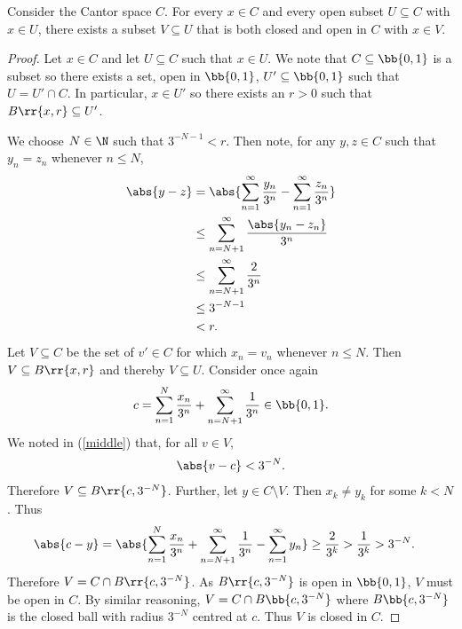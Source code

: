 \documentclass{article}
\begin{document}
\begin{claim*}[2d]
	Consider the Cantor space $C$. For every $x\in C$ and every open subset $U\subseteq C$
	with $x\in U$, there exists a subset $V\subseteq U$ that is both closed and open in $C$
	with $x\in V$.
	\begin{proof}
		Let $x\in C$ and let $U\subseteq C$ such that $x\in U$. We note that $C\subseteq\bb{0,1}$
		is a subset so there exists a set, open in $\bb{0,1}$, $U'\subseteq\bb{0,1}$ such that
		$U=U'\cap C$. In particular, $x\in U'$ so there exists an $r>0$ such that $B\rr{x,r}\subseteq U'$.

		We choose $N\in\N$ such that $3^{-N-1}<r$. Then note, for any $y,z\in C$ such that
		$y_n=z_n$ whenever $n\leq N$,
		\begin{align*}
			\abs{y-z} & = \abs{\sum_{n=1}^{\infty} \frac{y_n}{3^n} - \sum_{n=1}^{\infty} \frac{z_n}{3^n}} \\
			          & \leq \sum_{n=N+1}^{\infty} \frac{\abs{y_n-z_n}}{3^n}                              \\
			          & \leq \sum_{n=N+1}^{\infty} \frac{2}{3^n}                                          \\
			          & \leq 3^{-N-1}                                                                     \\
			          & <r.
		\end{align*}
		Let $V\subseteq C$ be the set of $v'\in C$ for which $x_n=v_n$ whenever $n\leq N$.
		Then $V\subseteq B\rr{x,r}$ and thereby $V\subseteq U$. Consider once again
		\begin{align*}
			c=\sum_{n=1}^{N} \frac{x_n}{3^n} + \sum_{n=N+1}^{\infty} \frac{1}{3^n} \in \bb{0,1}.
		\end{align*}
		We noted in (\ref{middle}) that, for all $v\in V$,
		\begin{align*}
			\abs{v-c}<3^{-N}.
		\end{align*}
		Therefore $V\subseteq B\rr{c,3^{-N}}$. Further, let $y\in C\setminus V$. Then
		$x_k\neq y_k$ for some $k<N$. Thus
		\begin{align*}
			\abs{c-y} & = \abs{\sum_{n=1}^{N} \frac{x_n}{3^n}+\sum_{n=N+1}^{\infty} \frac{1}{3^n} - \sum_{n=1}^{\infty} y_n}
			\geq \frac{2}{3^k} > \frac{1}{3^k} > 3^{-N}.
		\end{align*}
		Therefore $V=C\cap B\rr{c,3^{-N}}$. As $B\rr{c,3^{-N}}$ is open in $\bb{0,1}$, $V$ must be open in $C$.
		By similar reasoning, $V=C\cap B\bb{c,3^{-N}}$ where $B\bb{c,3^{-N}}$ is the closed ball with radius $3^{-N}$
		centred at $c$. Thus $V$ is closed in $C$.
	\end{proof}
\end{claim*}
\end{document}
